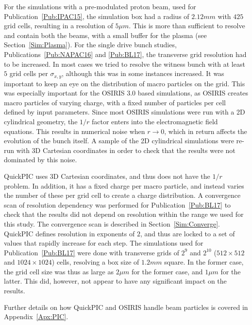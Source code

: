 For the simulations with a pre-modulated proton beam, used for Publication~\ref{Pub:IPAC15}, the simulation box had a radius of $2.12\unit{mm}$ with $425$ grid cells, resulting in a resolution of $5\unit{\mu m}$.
This is more than sufficient to resolve and contain both the beams, with a small buffer for the plasma (see Section~\ref{Sim:Plasma}).
For the single drive bunch studies, Publications~\ref{Pub:NAPAC16} and \ref{Pub:BL17}, the transverse grid resolution had to be increased.
In most cases we tried to resolve the witness bunch with at least $5$ grid cells per $\sigma_{x,y}$, although this was in some instances increased.
It was important to keep an eye on the distribution of macro particles on the grid.
This was especially important for the OSIRIS 3.0 based simulations, as OSIRIS creates macro particles of varying charge, with a fixed number of particles per cell defined by input parameters.
Since most OSIRIS simulations were run with a 2D cylindrical geometry, the $1/r$ factor enters into the electromagnetic field equations.
This results in numerical noise when $r \to 0$, which in return affects the evolution of the bunch itself.
A sample of the 2D cylindrical simulations were re-run with 3D Cartesian coordinates in order to check that the results were not dominated by this noise.

QuickPIC uses 3D Cartesian coordinates, and thus does not have the $1/r$ problem.
In addition, it has a fixed charge per macro particle, and instead varies the number of these per grid cell to create a charge distribution.
A convergence scan of resolution dependency was performed for Publication~\ref{Pub:BL17} to check that the results did not depend on resolution within the range we used for this study. The convergence scan is described in Section~\ref{Sim:Converge}.
QuickPIC defines resolution in exponents of $2$, and thus are locked to a set of values that rapidly increase for each step.
The simulations used for Publication~\ref{Pub:BL17} were done with transverse grids of $2^9$ and $2^10$ ($512 \times 512$ and $1024 \times 1024$) cells, resolving a box size of $1.2\unit{mm}$ square.
In the former case, the grid cell size was thus as large as $2\unit{\mu m}$ for the former case, and $1\unit{\mu m}$ for the latter.
This did, however, not appear to have any significant impact on the results.

Further details on how QuickPIC and OSIRIS handle beam particles is covered in Appendix~\ref{Apx:PIC}.

